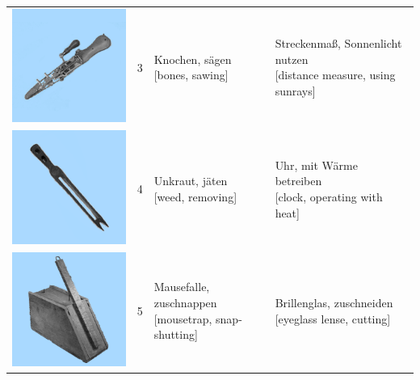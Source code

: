 \documentclass[
  english,
  man,floatsintext]{apa7}
\begin{document}
\begin{center}
\begin{ThreePartTable}
{\begin{longtable}{llll}
\includegraphics[valign=c, scale=0.23]{../materials/unfamiliar/3.png} & 3 & \makecell[l]{Knochen, sägen\\{[bones, sawing]}} & \makecell[l]{Streckenmaß, Sonnenlicht nutzen\\{[distance measure, using sunrays]}}\\
\includegraphics[valign=c, scale=0.23]{../materials/unfamiliar/4.png} & 4 & \makecell[l]{Unkraut, jäten\\{[weed, removing]}} & \makecell[l]{Uhr, mit Wärme betreiben\\{[clock, operating with heat]}}\\
\includegraphics[valign=c, scale=0.23]{../materials/unfamiliar/5.png} & 5 & \makecell[l]{Mausefalle, zuschnappen\\{[mousetrap, snap-shutting]}} & \makecell[l]{Brillenglas, zuschneiden\\{[eyeglass lense, cutting]}}\\

\end{longtable}}
\end{ThreePartTable}
\end{center}
\end{document}
